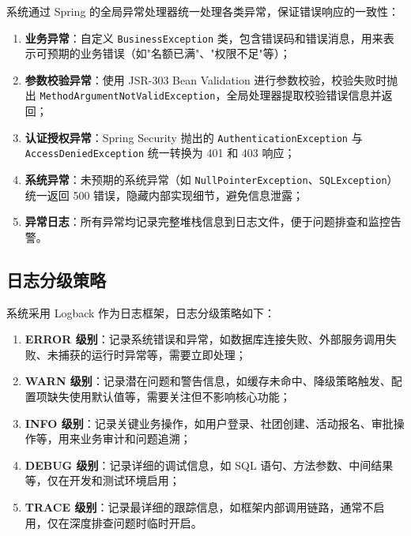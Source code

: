 系统通过 Spring 的全局异常处理器统一处理各类异常，保证错误响应的一致性：

\begin{enumerate}
  \item \textbf{业务异常}：自定义 \texttt{BusinessException} 类，包含错误码和错误消息，用来表示可预期的业务错误（如"名额已满"、"权限不足"等）；

  \item \textbf{参数校验异常}：使用 JSR-303 Bean Validation 进行参数校验，校验失败时抛出 \texttt{MethodArgumentNotValidException}，全局处理器提取校验错误信息并返回；

  \item \textbf{认证授权异常}：Spring Security 抛出的 \texttt{Authentication}\allowbreak\texttt{Exception} 与 \texttt{Access}\allowbreak\texttt{Denied}\allowbreak\texttt{Exception} 统一转换为 401 和 403 响应；

  \item \textbf{系统异常}：未预期的系统异常（如 \texttt{NullPointerException}、\texttt{SQLException}）统一返回 500 错误，隐藏内部实现细节，避免信息泄露；

  \item \textbf{异常日志}：所有异常均记录完整堆栈信息到日志文件，便于问题排查和监控告警。
\end{enumerate}

\subsection{日志分级策略}

系统采用 Logback 作为日志框架，日志分级策略如下：

\begin{enumerate}
  \item \textbf{ERROR 级别}：记录系统错误和异常，如数据库连接失败、外部服务调用失败、未捕获的运行时异常等，需要立即处理；

  \item \textbf{WARN 级别}：记录潜在问题和警告信息，如缓存未命中、降级策略触发、配置项缺失使用默认值等，需要关注但不影响核心功能；

  \item \textbf{INFO 级别}：记录关键业务操作，如用户登录、社团创建、活动报名、审批操作等，用来业务审计和问题追溯；

  \item \textbf{DEBUG 级别}：记录详细的调试信息，如 SQL 语句、方法参数、中间结果等，仅在开发和测试环境启用；

  \item \textbf{TRACE 级别}：记录最详细的跟踪信息，如框架内部调用链路，通常不启用，仅在深度排查问题时临时开启。
\end{enumerate}


